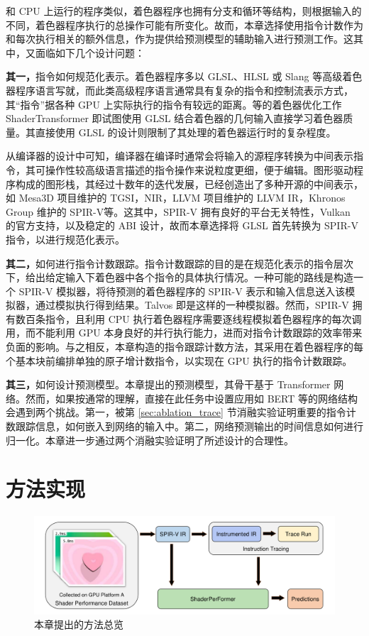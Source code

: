 {\amend 和 CPU 上运行的程序类似，着色器程序也拥有分支和循环等结构，则根据输入的不同，着色器程序执行的总操作可能有所变化。故而，本章选择使用指令计数作为和每次执行相关的额外信息，作为提供给预测模型的辅助输入进行预测工作。这其中，又面临如下几个设计问题：

{\bf 其一，}指令如何规范化表示。着色器程序多以 GLSL、HLSL 或 Slang 等高级着色器程序语言写就，而此类高级程序语言通常具有复杂的指令和控制流表示方式，其“指令”据各种 GPU 上实际执行的指令有较远的距离。\citet{10.1145/3528233.3530722}等的着色器优化工作 ShaderTransformer 即试图使用 GLSL 结合着色器的几何输入直接学习着色器质量。其直接使用 GLSL 的设计则限制了其处理的着色器运行时的复杂程度。

从编译器的设计中可知，编译器在编译时通常会将输入的源程序转换为中间表示指令，其可操作性较高级语言描述的指令操作来说粒度更细，便于编辑。图形驱动程序构成的图形栈，其经过十数年的迭代发展，已经创造出了多种开源的中间表示，如 Mesa3D 项目维护的 TGSI\cite{TGSI}，NIR\cite{NIR}，LLVM 项目维护的 LLVM IR\cite{LLVMIR}，Khronos Group 维护的 SPIR-V\cite{SPIRV}等。这其中，SPIR-V 拥有良好的平台无关特性，Vulkan 的官方支持，以及稳定的 ABI 设计，故而本章选择将 GLSL 首先转换为 SPIR-V 指令，以进行规范化表示。

{\bf 其二，}如何进行指令计数跟踪。指令计数跟踪的目的是在规范化表示的指令层次下，给出给定输入下着色器中各个指令的具体执行情况。一种可能的路线是构造一个 SPIR-V 模拟器，将待预测的着色器程序的 SPIR-V 表示和输入信息送入该模拟器，通过模拟执行得到结果。Talvos \cite{Talvos}即是这样的一种模拟器。然而，SPIR-V 拥有数百条指令，且利用 CPU 执行着色器程序需要逐线程模拟着色器程序的每次调用，而不能利用 GPU 本身良好的并行执行能力，进而对指令计数跟踪的效率带来负面的影响。与之相反，本章构造的指令跟踪计数方法，其采用在着色器程序的每个基本块前编排单独的原子增计数指令，以实现在 GPU 执行的指令计数跟踪。

{\bf 其三，}如何设计预测模型。本章提出的预测模型，其骨干基于 Transformer 网络。然而，如果按通常的理解，直接在此任务中设置应用如 BERT 等的网络结构会遇到两个挑战。第一，被第 \ref{sec:ablation_trace} 节消融实验证明重要的指令计数跟踪信息，如何嵌入到网络的输入中。第二，网络预测输出的时间信息如何进行归一化。本章进一步通过两个消融实验证明了所述设计的合理性。

}

\section{方法实现}

\begin{figure}[h]
  \centering
  \includegraphics[width=1\linewidth]{figures/OverviewNewNewNew.pdf}
  \caption{本章提出的方法总览}
  \label{fig:pipeline_overview}
\end{figure}

